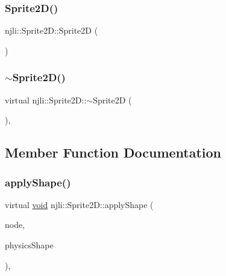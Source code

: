 \mbox{\label{classnjli_1_1_sprite2_d_ae9006247411dd22ca34f98cfe3f54f0c}} 
\subsubsection{\texorpdfstring{Sprite2\+D()}{Sprite2D()}\hspace{0.1cm}{\footnotesize\ttfamily [3/3]}}
{\footnotesize\ttfamily njli\+::\+Sprite2\+D\+::\+Sprite2D (\begin{DoxyParamCaption}\item[{const \mbox{\hyperlink{classnjli_1_1_sprite2_d}{Sprite2D}} \&}]{ }\end{DoxyParamCaption})\hspace{0.3cm}{\ttfamily [protected]}}

\mbox{\label{classnjli_1_1_sprite2_d_af0fcfd6f7e33f5147bd0d2749af11071}} 
\subsubsection{\texorpdfstring{$\sim$\+Sprite2\+D()}{~Sprite2D()}}
{\footnotesize\ttfamily virtual njli\+::\+Sprite2\+D\+::$\sim$\+Sprite2D (\begin{DoxyParamCaption}{ }\end{DoxyParamCaption})\hspace{0.3cm}{\ttfamily [protected]}, {\ttfamily [virtual]}}



\subsection{Member Function Documentation}
\mbox{\label{classnjli_1_1_sprite2_d_ae5133dcfd1e31e9686c1240e86feb7d4}} 
\subsubsection{\texorpdfstring{apply\+Shape()}{applyShape()}}
{\footnotesize\ttfamily virtual \mbox{\hyperlink{_thread_8h_af1e856da2e658414cb2456cb6f7ebc66}{void}} njli\+::\+Sprite2\+D\+::apply\+Shape (\begin{DoxyParamCaption}\item[{\mbox{\hyperlink{classnjli_1_1_node}{Node}} $\ast$}]{node,  }\item[{\mbox{\hyperlink{classnjli_1_1_physics_shape}{Physics\+Shape}} $\ast$}]{physics\+Shape }\end{DoxyParamCaption})\hspace{0.3cm}{\ttfamily [protected]}, {\ttfamily [virtual]}}

